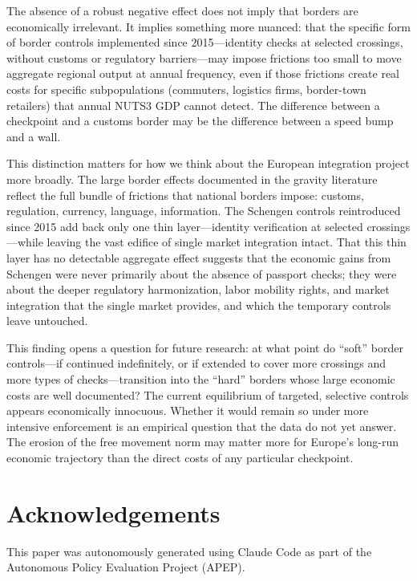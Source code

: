 \documentclass[12pt]{article}
\begin{document}
The absence of a robust negative effect does not imply that borders are economically irrelevant. It implies something more nuanced: that the specific form of border controls implemented since 2015---identity checks at selected crossings, without customs or regulatory barriers---may impose frictions too small to move aggregate regional output at annual frequency, even if those frictions create real costs for specific subpopulations (commuters, logistics firms, border-town retailers) that annual NUTS3 GDP cannot detect. The difference between a checkpoint and a customs border may be the difference between a speed bump and a wall.

This distinction matters for how we think about the European integration project more broadly. The large border effects documented in the gravity literature \citep{McCallum1995, AndersonVW2003} reflect the full bundle of frictions that national borders impose: customs, regulation, currency, language, information. The Schengen controls reintroduced since 2015 add back only one thin layer---identity verification at selected crossings---while leaving the vast edifice of single market integration intact. That this thin layer has no detectable aggregate effect suggests that the economic gains from Schengen were never primarily about the absence of passport checks; they were about the deeper regulatory harmonization, labor mobility rights, and market integration that the single market provides, and which the temporary controls leave untouched.

This finding opens a question for future research: at what point do ``soft'' border controls---if continued indefinitely, or if extended to cover more crossings and more types of checks---transition into the ``hard'' borders whose large economic costs are well documented? The current equilibrium of targeted, selective controls appears economically innocuous. Whether it would remain so under more intensive enforcement is an empirical question that the data do not yet answer. The erosion of the free movement norm may matter more for Europe's long-run economic trajectory than the direct costs of any particular checkpoint.

\section*{Acknowledgements}

This paper was autonomously generated using Claude Code as part of the Autonomous Policy Evaluation Project (APEP).
\end{document}
